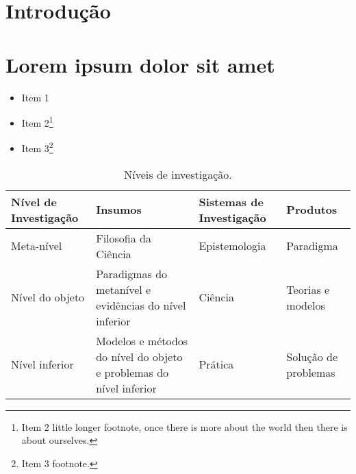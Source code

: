 \documentclass[twoside,openright,a4paper]{abntex2}
\begin{document}
\chapter{Introdução}

\lipsum[1-2]


\chapter{Lorem ipsum dolor sit amet}

\lipsum[3]

\begin{itemize}
  \item Item 1
  \item Item 2\footnote{Item 2 little longer footnote, once there is more
  about the world then there is about ourselves.}
  \item Item 3\footnote{Item 3 footnote.}
\end{itemize}


\lipsum[4]

\begin{table}[htb]
\footnotesize
\caption[Níveis de investigação]{\footnotesize{Níveis de investigação.
\cite{van86}}}
\label{tab-nivinv}
\begin{tabular}{p{2.6cm}|p{6.0cm}|p{2.25cm}|p{3.40cm}}
   \textbf{Nível de Investigação} & \textbf{Insumos}  & \textbf{Sistemas de Investigação}  & \textbf{Produtos}  \\
    \hline
    Meta-nível & Filosofia\index{Filosofia} da Ciência  & Epistemologia &
    Paradigma  \\
    \hline
    Nível do objeto & Paradigmas do metanível e evidências do nível inferior &
    Ciência  & Teorias e modelos \\
    \hline
    Nível inferior & Modelos e métodos do nível do objeto e problemas do nível inferior & Prática & Solução de problemas  \\
\end{tabular}
\end{table}

\lipsum[5]

\end{document}
